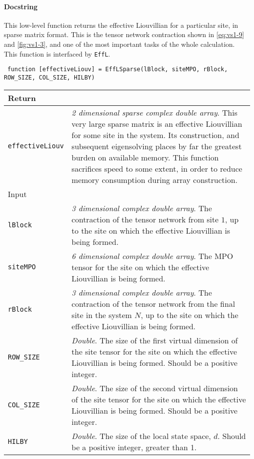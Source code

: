  \paragraph{Docstring} This low-level function returns the effective Liouvillian for a particular site, in sparse matrix format. This is the tensor network contraction shown in \cref{eq:vs1-9} and \cref{fig:vs1-3}, and one of the most important tasks of the whole calculation. This function is interfaced by \lstinline$EffL$.
 \begin{lstlisting}
 function [effectiveLiouv] = EffLSparse(lBlock, siteMPO, rBlock, ROW_SIZE, COL_SIZE, HILBY) \end{lstlisting}
 \begin{longtabu}{X[1,1]X[4,1]}
 \hline
 Return & \\ \hline
 \lstinline$effectiveLiouv$ & \emph{2 dimensional sparse complex double array}. This very large sparse matrix is an effective Liouvillian for some site in the system. Its construction, and subsequent eigensolving places by far the greatest burden on available memory. This function sacrifices speed to some extent, in order to reduce memory consumption during array construction. \\ \hline
 Input & \\ \hline
 \lstinline$lBlock$ & \emph{3 dimensional complex double array}. The contraction of the tensor network from site \(1\), up to the site on which the effective Liouvillian is being formed. \\
 \lstinline$siteMPO$ & \emph{6 dimensional complex double array}. The MPO tensor for the site on which the effective Liouvillian is being formed. \\
 \lstinline$rBlock$ & \emph{3 dimensional complex double array}. The contraction of the tensor network from the final site in the system \(N\), up to the site on which the effective Liouvillian is being formed. \\
 \lstinline$ROW_SIZE$ & \emph{Double}. The size of the first virtual dimension of the site tensor for the site on which the effective Liouvillian is being formed. Should be a positive integer. \\
 \lstinline$COL_SIZE$ & \emph{Double}. The size of the second virtual dimension of the site tensor for the site on which the effective Liouvillian is being formed. Should be a positive integer. \\
 \lstinline$HILBY$ & \emph{Double}. The size of the local state space, \(d\). Should be a positive integer, greater than 1. \\
 \hline
 \end{longtabu}
